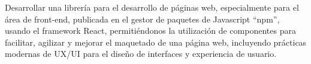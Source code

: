 Desarrollar una librería para el desarrollo de páginas web, especialmente para el área de front-end, publicada en el gestor de paquetes de Javascript “npm”, usando el framework React, permitiéndonos la utilización de componentes para facilitar, agilizar y mejorar el maquetado de una página web, incluyendo prácticas modernas de UX/UI para el diseño de interfaces y experiencia de usuario. 
